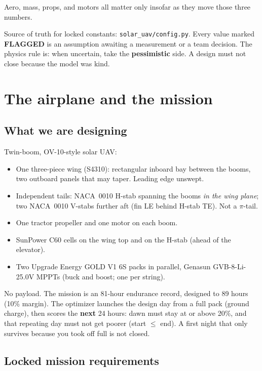 \documentclass[11pt,letterpaper]{article}
\newcommand{\flag}{\textcolor{red!60!black}{\textbf{FLAGGED}}}
\newcommand{\code}[1]{\texttt{#1}}
\begin{document}
Aero, mass, props, and motors all matter only insofar as they move those three numbers.

Source of truth for locked constants: \code{solar\_uav/config.py}. Every value marked \flag{} is an assumption awaiting a measurement or a team decision. The physics rule is: when uncertain, take the \textbf{pessimistic} side. A design must not close because the model was kind.

\section{The airplane and the mission}

\subsection{What we are designing}

Twin-boom, OV-10-style solar UAV:

\begin{itemize}
  \item One three-piece wing (S4310): rectangular inboard bay between the booms, two outboard panels that may taper. Leading edge unswept.
  \item Independent tails: NACA~0010 H-stab spanning the booms \emph{in the wing plane}; two NACA~0010 V-stabs further aft (fin LE behind H-stab TE). Not a $\pi$-tail.
  \item One tractor propeller and one motor on each boom.
  \item SunPower C60 cells on the wing top and on the H-stab (ahead of the elevator).
  \item Two Upgrade Energy GOLD V1 6S packs in parallel, Genasun GVB-8-Li-25.0V MPPTs (buck and boost; one per string).
\end{itemize}

No payload. The mission is an 81-hour endurance record, designed to 89 hours (10\% margin). The optimizer launches the design day from a full pack (ground charge), then scores the \textbf{next} 24 hours: dawn must stay at or above 20\%, and that repeating day must not get poorer (start $\le$ end). A first night that only survives because you took off full is not closed.

\subsection{Locked mission requirements}
\end{document}
